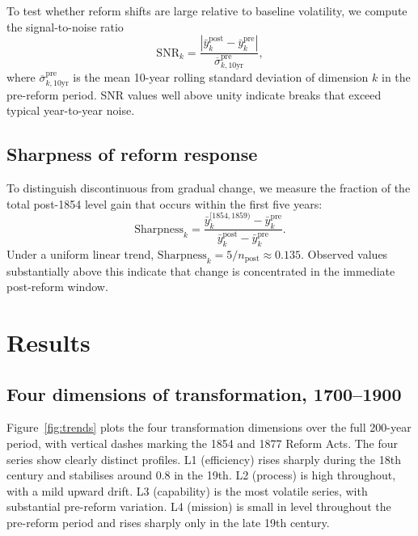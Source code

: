 \documentclass[11pt]{article}
\begin{document}
To test whether reform shifts are large relative to baseline volatility, we compute the signal-to-noise ratio
\begin{equation}
\text{SNR}_{k} = \frac{|\bar{y}^{\text{post}}_{k} - \bar{y}^{\text{pre}}_{k}|}{\overline{\sigma}^{\text{pre}}_{k, \text{10yr}}},
\end{equation}
where $\overline{\sigma}^{\text{pre}}_{k, \text{10yr}}$ is the mean 10-year rolling standard deviation of dimension $k$ in the pre-reform period. SNR values well above unity indicate breaks that exceed typical year-to-year noise.

\subsection{Sharpness of reform response}

To distinguish discontinuous from gradual change, we measure the fraction of the total post-1854 level gain that occurs within the first five years:
\begin{equation}
\text{Sharpness}_{k} = \frac{\bar{y}^{[1854, 1859)}_{k} - \bar{y}^{\text{pre}}_{k}}{\bar{y}^{\text{post}}_{k} - \bar{y}^{\text{pre}}_{k}}.
\end{equation}
Under a uniform linear trend, $\text{Sharpness}_{k} = 5/n_{\text{post}} \approx 0.135$. Observed values substantially above this indicate that change is concentrated in the immediate post-reform window.

\section{Results}
\label{sec:results}

\subsection{Four dimensions of transformation, 1700--1900}

Figure~\ref{fig:trends} plots the four transformation dimensions over the full 200-year period, with vertical dashes marking the 1854 and 1877 Reform Acts. The four series show clearly distinct profiles. L1 (efficiency) rises sharply during the 18th century and stabilises around 0.8 in the 19th. L2 (process) is high throughout, with a mild upward drift. L3 (capability) is the most volatile series, with substantial pre-reform variation. L4 (mission) is small in level throughout the pre-reform period and rises sharply only in the late 19th century.
\end{document}
